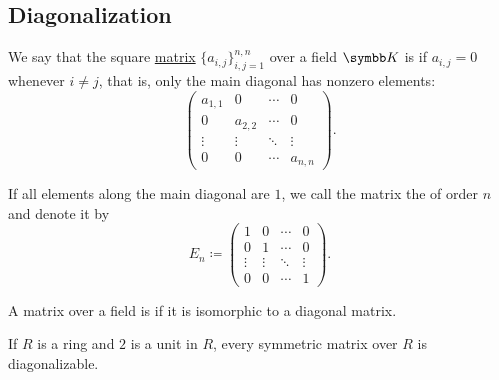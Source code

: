 \subsection{Diagonalization}\label{subsec:diagonalization}

\begin{definition}\label{def:diagonal_matrix}
  We say that the square \hyperref[def:array/matrix]{matrix} \( \{ a_{i,j} \}_{i,j=1}^{n,n} \) over a field \( \BK \) is  if \( a_{i,j} = 0 \) whenever \( i \neq j \), that is, only the main diagonal has nonzero elements:
  \begin{equation*}
    \begin{pmatrix}
      a_{1,1} & 0       & \cdots & 0       \\
      0       & a_{2,2} & \cdots & 0       \\
      \vdots  & \vdots  & \ddots & \vdots  \\
      0       & 0       & \cdots & a_{n,n}
    \end{pmatrix}.
  \end{equation*}

  If all elements along the main diagonal are \( 1 \), we call the matrix the  of order \( n \) and denote it by
  \begin{equation*}
    E_n \coloneqq
    \begin{pmatrix}
      1      & 0      & \cdots & 0      \\
      0      & 1      & \cdots & 0      \\
      \vdots & \vdots & \ddots & \vdots \\
      0      & 0      & \cdots & 1
    \end{pmatrix}.
  \end{equation*}
\end{definition}

\begin{definition}\label{def:diagonalizable_matrix}
  A matrix over a field is  if it is isomorphic to a diagonal matrix.
\end{definition}

\begin{theorem}\label{def:spectral_theorem_for_matrices}
  If \( R \) is a ring and \( 2 \) is a unit in \( R \), every symmetric matrix over \( R \) is diagonalizable.
\end{theorem}
